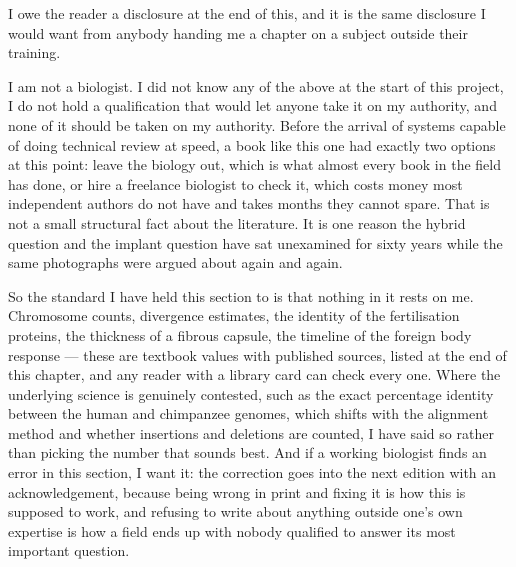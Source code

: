 I owe the reader a disclosure at the end of this, and it is the same disclosure I would want from
anybody handing me a chapter on a subject outside their training.

I am not a biologist. I did not know any of the above at the start of this project, I do not hold a
qualification that would let anyone take it on my authority, and none of it should be taken on my
authority. Before the arrival of systems capable of doing technical review at speed, a book like
this one had exactly two options at this point: leave the biology out, which is what almost every
book in the field has done, or hire a freelance biologist to check it, which costs money most
independent authors do not have and takes months they cannot spare. That is not a small structural
fact about the literature. It is one reason the hybrid question and the implant question have sat
unexamined for sixty years while the same photographs were argued about again and again.

So the standard I have held this section to is that nothing in it rests on me. Chromosome counts,
divergence estimates, the identity of the fertilisation proteins, the thickness of a fibrous
capsule, the timeline of the foreign body response --- these are textbook values with published
sources, listed at the end of this chapter, and any reader with a library card can check every one.
Where the underlying science is genuinely contested, such as the exact percentage identity between
the human and chimpanzee genomes, which shifts with the alignment method and whether insertions and
deletions are counted, I have said so rather than picking the number that sounds best. And if a
working biologist finds an error in this section, I want it: the correction goes into the next
edition with an acknowledgement, because being wrong in print and fixing it is how this is supposed
to work, and refusing to write about anything outside one's own expertise is how a field ends up
with nobody qualified to answer its most important question.

